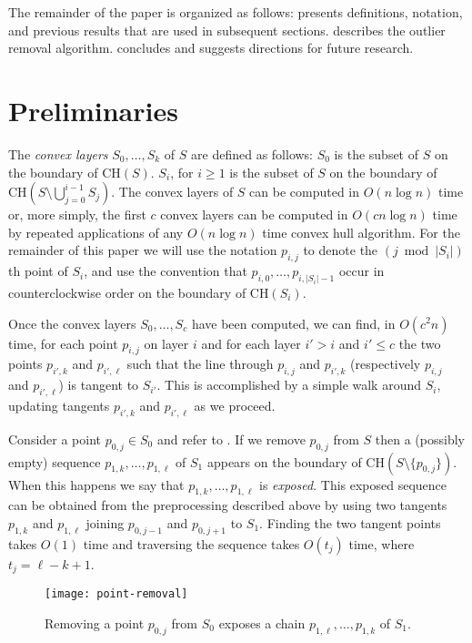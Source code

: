 \documentclass[lotsofwhite]{patmorin}
\newcommand{\ch}{\mathrm{CH}}
\begin{document}
The remainder of the paper is organized as follows:
 presents definitions, notation, and previous
results that are used in subsequent sections. 
describes the outlier removal algorithm. 
concludes and suggests directions for future research.
 

\section{Preliminaries} 

The \emph{convex layers} $S_0,\ldots,S_k$ of $S$ are defined as
follows: $S_0$ is the subset of $S$ on the boundary of $\ch(S)$.
$S_i$, for $i\ge 1$ is the subset of $S$ on the boundary of
$\ch(S\setminus\bigcup_{j=0}^{i-1} S_j)$.  The convex layers of $S$
can be computed in $O(n\log n)$ time \cite{c85,hs92} or, more simply,
the first $c$ convex layers can be computed in $O(cn\log n)$ time by
repeated applications of any $O(n\log n)$ time convex hull algorithm.
For the remainder of this paper we will use the notation $p_{i,j}$ to
denote the $(j\bmod |S_i|)$th point of $S_i$, and use the convention
that $p_{i,0},\ldots,p_{i,|S_i|-1}$ occur in counterclockwise order on
the boundary of $\ch(S_i)$.

Once the convex layers $S_0,\ldots,S_c$ have been computed, we can
find, in $O(c^2 n)$ time, for each point $p_{i,j}$ on layer $i$ and
for each layer $i'> i$ and $i'\le c$ the two points $p_{i',k}$ and
$p_{i',\ell}$ such that the line through $p_{i,j}$ and $p_{i',k}$
(respectively $p_{i,j}$ and $p_{i',\ell}$) is tangent to $S_{i'}$.
This is accomplished by a simple walk around $S_i$, updating tangents
$p_{i',k}$ and $p_{i',\ell}$ as we proceed.

Consider a point $p_{0,j}\in S_0$ and refer to .
If we remove $p_{0,j}$ from $S$ then a (possibly empty) sequence
$p_{1,k},\ldots,p_{1,\ell}$ of $S_1$ appears on the boundary of
$\ch(S\setminus\{p_{0,j}\})$.  When this happens we say that
$p_{1,k},\ldots,p_{1,\ell}$ is \emph{exposed}.  This exposed sequence
can be obtained from the preprocessing described above by using two
tangents $p_{1,k}$ and $p_{1,\ell}$ joining $p_{0,j-1}$ and
$p_{0,j+1}$ to $S_1$.  Finding the two tangent points takes $O(1)$
time and traversing the sequence takes $O(t_j)$ time, where
$t_j=\ell-k+1$.

\begin{figure}
\begin{center}\texttt{[image: point-removal]}\end{center}
\caption{Removing a point $p_{0,j}$ from $S_0$ exposes a chain
$p_{1,\ell},\ldots,p_{1,k}$ of $S_1$.}
\end{figure}
\end{document}
